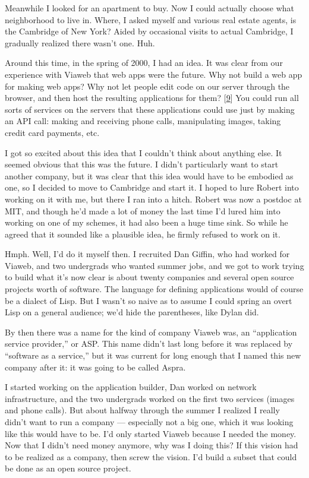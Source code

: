 Meanwhile I looked for an apartment to buy. Now I could actually choose
what neighborhood to live in. Where, I asked myself and various real
estate agents, is the Cambridge of New York? Aided by occasional visits
to actual Cambridge, I gradually realized there wasn't one. Huh.

Around this time, in the spring of 2000, I had an idea. It was clear
from our experience with Viaweb that web apps were the future. Why not
build a web app for making web apps? Why not let people edit code on our
server through the browser, and then host the resulting applications for
them? {[}\hyperref[f9n]{9}{]} You could run all sorts of services on the
servers that these applications could use just by making an API call:
making and receiving phone calls, manipulating images, taking credit
card payments, etc.

I got so excited about this idea that I couldn't think about anything
else. It seemed obvious that this was the future. I didn't particularly
want to start another company, but it was clear that this idea would
have to be embodied as one, so I decided to move to Cambridge and start
it. I hoped to lure Robert into working on it with me, but there I ran
into a hitch. Robert was now a postdoc at MIT, and though he'd made a
lot of money the last time I'd lured him into working on one of my
schemes, it had also been a huge time sink. So while he agreed that it
sounded like a plausible idea, he firmly refused to work on it.

Hmph. Well, I'd do it myself then. I recruited Dan Giffin, who had
worked for Viaweb, and two undergrads who wanted summer jobs, and we got
to work trying to build what it's now clear is about twenty companies
and several open source projects worth of software. The language for
defining applications would of course be a dialect of Lisp. But I wasn't
so naive as to assume I could spring an overt Lisp on a general
audience; we'd hide the parentheses, like Dylan did.

By then there was a name for the kind of company Viaweb was, an
``application service provider,'' or ASP. This name didn't last long
before it was replaced by ``software as a service,'' but it was current
for long enough that I named this new company after it: it was going to
be called Aspra.

I started working on the application builder, Dan worked on network
infrastructure, and the two undergrads worked on the first two services
(images and phone calls). But about halfway through the summer I
realized I really didn't want to run a company --- especially not a big
one, which it was looking like this would have to be. I'd only started
Viaweb because I needed the money. Now that I didn't need money anymore,
why was I doing this? If this vision had to be realized as a company,
then screw the vision. I'd build a subset that could be done as an open
source project.

